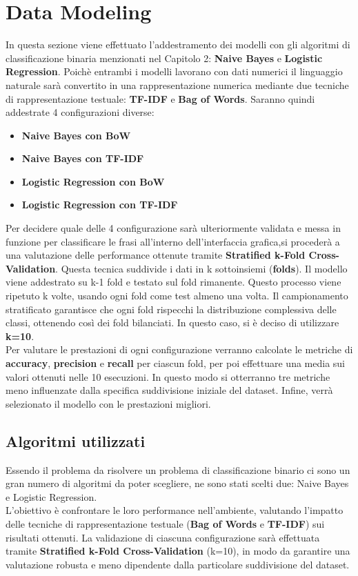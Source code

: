 \documentclass[12pt,a4paper]{report} %
\begin{document}
\chapter{Data Modeling}
In questa sezione viene effettuato l'addestramento dei modelli con gli algoritmi di classificazione binaria menzionati nel Capitolo 2: \textbf{Naive Bayes} e \textbf{Logistic Regression}. Poichè entrambi i modelli lavorano con dati numerici il linguaggio naturale sarà convertito in una rappresentazione numerica mediante due tecniche di rappresentazione testuale: \textbf{TF-IDF} e \textbf{Bag of Words}. Saranno quindi addestrate 4 configurazioni diverse:
\begin{itemize}
    \item \textbf{Naive Bayes con BoW}
    \item \textbf{Naive Bayes con TF-IDF }
    \item \textbf{Logistic Regression con BoW}
    \item \textbf{Logistic Regression con TF-IDF}
\end{itemize}
Per decidere quale delle 4 configurazione sarà ulteriormente validata e messa in funzione per classificare le frasi all'interno dell'interfaccia grafica,si procederà a una valutazione delle performance ottenute tramite \textbf{Stratified k-Fold Cross-Validation}. Questa tecnica suddivide i dati in k sottoinsiemi (\textbf{folds}). Il modello viene addestrato su k-1 fold e testato sul fold rimanente. Questo processo viene ripetuto k volte, usando ogni fold come test almeno una volta. Il campionamento stratificato garantisce che ogni fold rispecchi la distribuzione complessiva delle classi, ottenendo così dei fold bilanciati. In questo caso, si è deciso di utilizzare \textbf{k=10}.  \\Per valutare le prestazioni di ogni configurazione verranno calcolate le metriche di \textbf{accuracy}, \textbf{precision} e \textbf{recall} per ciascun fold, per poi effettuare una media sui valori ottenuti nelle 10 esecuzioni. In questo modo si otterranno tre metriche meno influenzate dalla specifica suddivisione iniziale del dataset. Infine, verrà selezionato il modello con le prestazioni migliori.
\section{Algoritmi utilizzati}
Essendo il problema da risolvere un problema di classificazione binario ci sono un gran numero di algoritmi da poter scegliere, ne sono stati scelti due: Naive Bayes e Logistic Regression. \\L’obiettivo è confrontare le loro performance nell'ambiente, valutando l’impatto delle tecniche di rappresentazione testuale (\textbf{Bag of Words} e \textbf{TF-IDF}) sui risultati ottenuti. La validazione di ciascuna configurazione sarà effettuata tramite \textbf{Stratified k-Fold Cross-Validation} (k=10), in modo da garantire una valutazione robusta e meno dipendente dalla particolare suddivisione del dataset.
\end{document}
